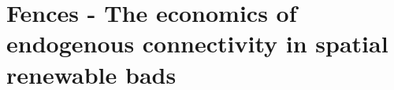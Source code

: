 \chapter{Fences - The economics of endogenous connectivity in spatial renewable bads}



\begin{minipage}{0.9\textwidth}
\singlespace

\end{minipage}
